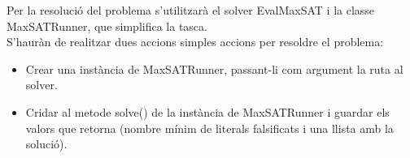 \documentclass[../informe.tex]{subfiles}
\begin{document}
Per la resolució del problema s'utilitzarà el solver EvalMaxSAT i la classe MaxSATRunner, que simplifica la tasca. \\
S'hauràn de realitzar dues accions simples accions per resoldre el problema:

\begin{itemize}
  \item Crear una instància de MaxSATRunner, passant-li com argument la ruta al solver.
  \item Cridar al metode solve() de la instància de MaxSATRunner i guardar els valors que retorna (nombre mínim de literals falsificats i una llista amb la solució).
\end{itemize}
\end{document}
